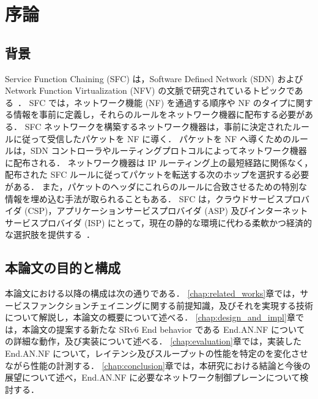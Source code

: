 \chapter{序論}
\label{chap:introduction}

\section{背景}
\label{section:background}
Service Function Chaining (SFC) は，Software Defined Network (SDN) および Network Function Virtualization (NFV) の文脈で研究されているトピックである~\cite{nfv,sfc-on-sdn-nfv-servey,sfc-on-sdn-scenario,imple-sfc-with-openflow}．
SFC では，ネットワーク機能 (NF) を通過する順序や NF のタイプに関する情報を事前に定義し，それらのルールをネットワーク機器に配布する必要がある．
SFC ネットワークを構築するネットワーク機器は，事前に決定されたルールに従って受信したパケットを NF に導く．
パケットを NF へ導くためのルールは，SDN コントローラやルーティングプロトコルによってネットワーク機器に配布される．
ネットワーク機器は IP ルーティング上の最短経路に関係なく，配布された SFC ルールに従ってパケットを転送する次のホップを選択する必要がある．
また，パケットのヘッダにこれらのルールに合致させるための特別な情報を埋め込む手法が取られることもある．
SFC は，クラウドサービスプロバイダ (CSP)，アプリケーションサービスプロバイダ (ASP) 及びインターネットサービスプロバイダ (ISP) にとって，現在の静的な環境に代わる柔軟かつ経済的な選択肢を提供する~\cite{survey-on-sfc}．


\section{本論文の目的と構成}
本論文における以降の構成は次の通りである．
\ref*{chap:related_works}章では，サービスファンクションチェイニングに関する前提知識，及びそれを実現する技術について解説し，本論文の概要について述べる．
\ref*{chap:design_and_impl}章では，本論文の提案する新たな SRv6 End behavior である End.AN.NF についての詳細な動作，及び実装について述べる．
\ref*{chap:evaluation}章では，実装した End.AN.NF について，レイテンシ及びスループットの性能を特定のを変化させながら性能の計測する．
\ref*{chap:conclusion}章では，本研究における結論と今後の展望について述べ，End.AN.NF に必要なネットワーク制御プレーンについて検討する．